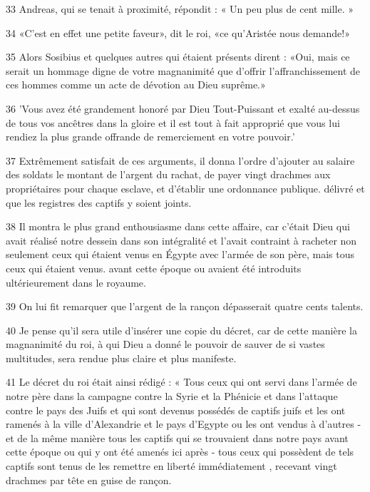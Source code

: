 \par 33 Andreas, qui se tenait à proximité, répondit : « Un peu plus de cent mille. »

\par 34 «C'est en effet une petite faveur», dit le roi, «ce qu'Aristée nous demande!»

\par 35 Alors Sosibius et quelques autres qui étaient présents dirent : «Oui, mais ce serait un hommage digne de votre magnanimité que d'offrir l'affranchissement de ces hommes comme un acte de dévotion au Dieu suprême.»

\par 36 'Vous avez été grandement honoré par Dieu Tout-Puissant et exalté au-dessus de tous vos ancêtres dans la gloire et il est tout à fait approprié que vous lui rendiez la plus grande offrande de remerciement en votre pouvoir.'

\par 37 Extrêmement satisfait de ces arguments, il donna l'ordre d'ajouter au salaire des soldats le montant de l'argent du rachat, de payer vingt drachmes aux propriétaires pour chaque esclave, et d'établir une ordonnance publique. délivré et que les registres des captifs y soient joints.

\par 38 Il montra le plus grand enthousiasme dans cette affaire, car c'était Dieu qui avait réalisé notre dessein dans son intégralité et l'avait contraint à racheter non seulement ceux qui étaient venus en Égypte avec l'armée de son père, mais tous ceux qui étaient venus. avant cette époque ou avaient été introduits ultérieurement dans le royaume.

\par 39 On lui fit remarquer que l'argent de la rançon dépasserait quatre cents talents.

\par 40 Je pense qu'il sera utile d'insérer une copie du décret, car de cette manière la magnanimité du roi, à qui Dieu a donné le pouvoir de sauver de si vastes multitudes, sera rendue plus claire et plus manifeste.

\par 41 Le décret du roi était ainsi rédigé : « Tous ceux qui ont servi dans l'armée de notre père dans la campagne contre la Syrie et la Phénicie et dans l'attaque contre le pays des Juifs et qui sont devenus possédés de captifs juifs et les ont ramenés à la ville d'Alexandrie et le pays d'Egypte ou les ont vendus à d'autres - et de la même manière tous les captifs qui se trouvaient dans notre pays avant cette époque ou qui y ont été amenés ici après - tous ceux qui possèdent de tels captifs sont tenus de les remettre en liberté immédiatement , recevant vingt drachmes par tête en guise de rançon.

